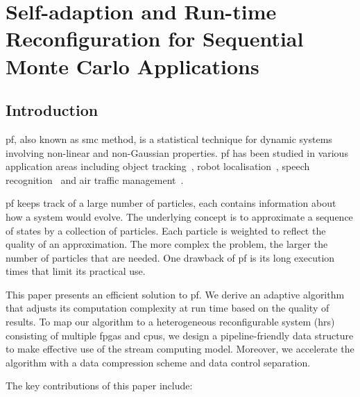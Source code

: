 
\chapter[Self-adaption \& Run-time Reconfiguration for SMC Applications]{Self-adaption and Run-time Reconfiguration for Sequential Monte Carlo Applications}

\label{ch:run-time}

\section{Introduction}

\gls{pf}, also known as \gls{smc} method, is a statistical technique for dynamic systems involving non-linear and non-Gaussian properties. 
\gls{pf} has been studied in various application areas including object tracking~\cite{happe11}, robot localisation~\cite{montemerlo02}, speech recognition~\cite{vermaak02} and air traffic management~\cite{eele11}.

\gls{pf} keeps track of a large number of particles, each contains information about how a system would evolve.
The underlying concept is to approximate a sequence of states by a collection of particles.
Each particle is weighted to reflect the quality of an approximation.
The more complex the problem, the larger the number of particles that are needed.
One drawback of \gls{pf} is its long execution times that limit its practical use.

This paper presents an efficient solution to \gls{pf}.
We derive an adaptive algorithm that adjusts its computation complexity at run time based on the quality of results.
To map our algorithm to a heterogeneous reconfigurable system (\gls{hrs}) consisting of multiple \gls{fpga}s and \gls{cpu}s,
we design a pipeline-friendly data structure to make effective use of the stream computing model.
Moreover, we accelerate the algorithm with a data compression scheme and data control separation.

The key contributions of this paper include:

